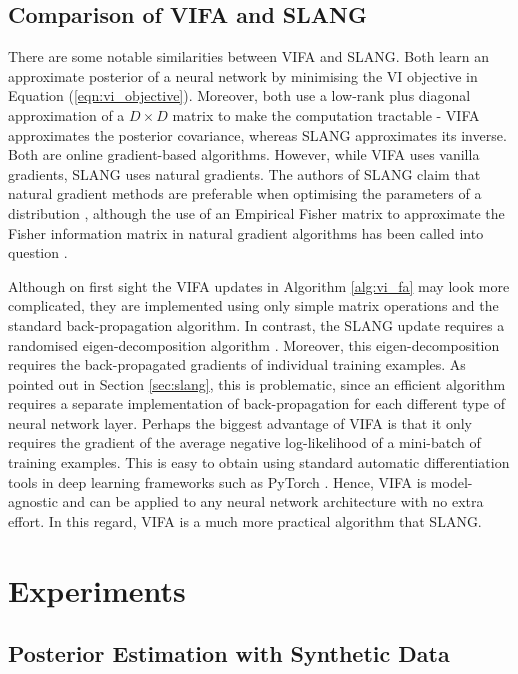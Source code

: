 \documentclass[msc,deptreport.inf]{infthesis} %
\begin{document}
\subsection{Comparison of VIFA and SLANG}

There are some notable similarities between VIFA and SLANG. Both learn an approximate posterior of a neural network by minimising the VI objective in Equation (\ref{eqn:vi_objective}). Moreover, both use a low-rank plus diagonal approximation of a $D \times D$ matrix to make the computation tractable - VIFA approximates the posterior covariance, whereas SLANG approximates its inverse. Both are online gradient-based algorithms. However, while VIFA uses vanilla gradients, SLANG uses natural gradients. The authors of SLANG claim that natural gradient methods are preferable when optimising the parameters of a distribution \cite{mishkin2018}, although the use of an Empirical Fisher matrix to approximate the Fisher information matrix in natural gradient algorithms has been called into question \cite{kunstner2019}. 

Although on first sight the VIFA updates in Algorithm \ref{alg:vi_fa} may look more complicated, they are implemented using only simple matrix operations and the standard back-propagation algorithm. In contrast, the SLANG update requires a randomised eigen-decomposition algorithm \cite{mishkin2018}. Moreover, this eigen-decomposition requires the back-propagated gradients of individual training examples. As pointed out in Section \ref{sec:slang}, this is problematic, since an efficient algorithm requires a separate implementation of back-propagation for each different type of neural network layer. Perhaps the biggest advantage of VIFA is that it only requires the gradient of the average negative log-likelihood of a mini-batch of training examples. This is easy to obtain using standard automatic differentiation tools in deep learning frameworks such as PyTorch \cite{paszke2019}. Hence, VIFA is model-agnostic and can be applied to any neural network architecture with no extra effort. In this regard, VIFA is a much more practical algorithm that SLANG.


\section{Experiments}

\subsection{Posterior Estimation with Synthetic Data}\label{sec:vifa_posterior_synthetic}
 
\end{document}
